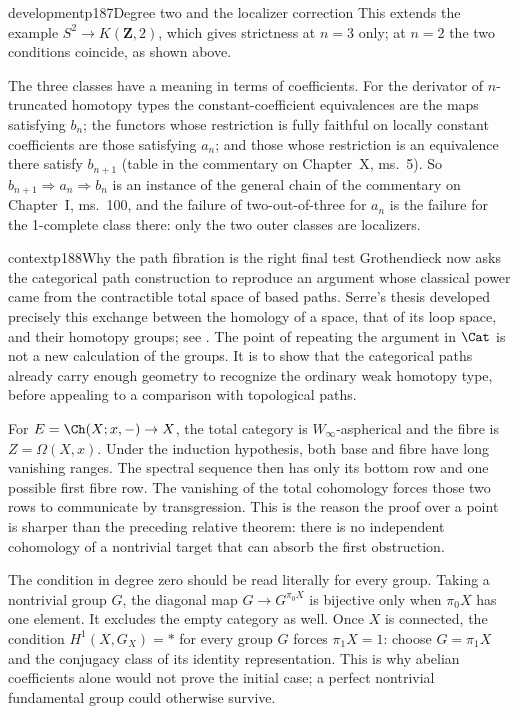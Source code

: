 \begin{dcomment}{development}{p187}{Degree two and the localizer correction}
This extends the example $S^2\to K(\mathbf Z,2)$, which gives strictness at $n=3$ only; at $n=2$ the two conditions coincide, as shown above.

The three classes have a meaning in terms of coefficients. For the derivator of $n$-truncated homotopy types the constant-coefficient equivalences are the maps satisfying $b_n$; the functors whose restriction is fully faithful on locally constant coefficients are those satisfying $a_n$; and those whose restriction is an equivalence there satisfy $b_{n+1}$ (table in the commentary on Chapter~X, ms.~5). So $b_{n+1}\Rightarrow a_n\Rightarrow b_n$ is an instance of the general chain of the commentary on Chapter~I, ms.~100, and the failure of two-out-of-three for $a_n$ is the failure for the 1-complete class there: only the two outer classes are localizers.
\end{dcomment}

\begin{dcomment}{context}{p188}{Why the path fibration is the right final test}
Grothendieck now asks the categorical path construction to reproduce an argument whose classical power came from the contractible total space of based paths. Serre's thesis developed precisely this exchange between the homology of a space, that of its loop space, and their homotopy groups; see \citet[Chapter~IV, \S5, Proposition~7]{Serre1951}. The point of repeating the argument in $\Cat$ is not a new calculation of the groups. It is to show that the categorical paths already carry enough geometry to recognize the ordinary weak homotopy type, before appealing to a comparison with topological paths.

For $E=\Ch(X;x,-)\to X$, the total category is $W_\infty$-aspherical and the fibre is $Z=\Omega(X,x)$. Under the induction hypothesis, both base and fibre have long vanishing ranges. The spectral sequence then has only its bottom row and one possible first fibre row. The vanishing of the total cohomology forces those two rows to communicate by transgression. This is the reason the proof over a point is sharper than the preceding relative theorem: there is no independent cohomology of a nontrivial target that can absorb the first obstruction.

The condition in degree zero should be read literally for every group. Taking a nontrivial group $G$, the diagonal map $G\to G^{\pi_0X}$ is bijective only when $\pi_0X$ has one element. It excludes the empty category as well. Once $X$ is connected, the condition $H^1(X,G_X)=*$ for every group $G$ forces $\pi_1X=1$: choose $G=\pi_1X$ and the conjugacy class of its identity representation. This is why abelian coefficients alone would not prove the initial case; a perfect nontrivial fundamental group could otherwise survive.
\end{dcomment}

